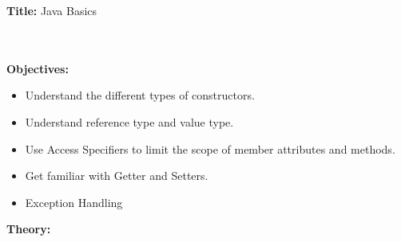 \documentclass{book}
\begin{document}
{\Huge \textbf{Title:} Java Basics}
\\
\\
\\
\par
{\large \textbf{Objectives:}}
\begin{itemize}
    \item{Understand the different types of constructors.}
    \item{Understand reference type and value type.}
    \item{Use Access Specifiers to limit the scope of member attributes and methods.}
    \item{Get familiar with Getter and Setters.}
    \item{Exception Handling}
\end{itemize}
\par
{\large \textbf{Theory:}}
\end{document}

